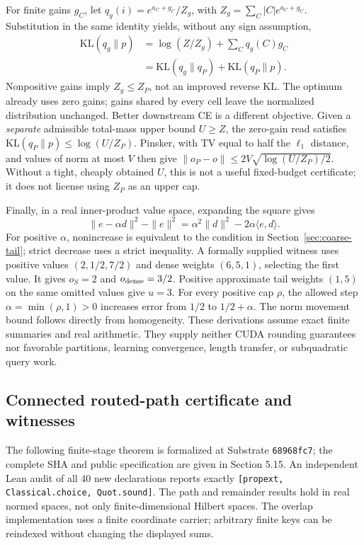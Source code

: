 \documentclass[11pt]{article}
\numberwithin{equation}{section}
\newcommand{\inner}[2]{\langle #1, #2\rangle}
\begin{document}
For finite gains $g_C$, let $q_g(i)=e^{a_C+g_C}/Z_g$, with $Z_g=\sum_C|C|e^{a_C+g_C}$. Substitution
in the same identity yields, without any sign assumption,
\begin{equation}\label{eq:coarse-gain-kl}
\begin{split}
\mathrm{KL}(q_g\|p)&=\log(Z/Z_g)+\sum_C q_g(C)g_C\\
&=\mathrm{KL}(q_g\|q_P)+\mathrm{KL}(q_P\|p).
\end{split}
\end{equation}
Nonpositive gains imply $Z_g\le Z_P$, not an improved reverse KL. The optimum already uses zero gains;
gains shared by every cell leave the normalized distribution unchanged. Better downstream CE is a
different objective. Given a \emph{separate} admissible total-mass upper bound $U\ge Z$, the zero-gain read
satisfies $\mathrm{KL}(q_P\|p)\le\log(U/Z_P)$. Pinsker, with TV equal to half the $\ell_1$ distance,
and values of norm at most $V$ then give
$\|o_P-o\|\le2V\sqrt{\log(U/Z_P)/2}$. Without a tight, cheaply obtained $U$, this is not a useful
fixed-budget certificate; it does not license using $Z_P$ as an upper cap.

Finally, in a real inner-product value space, expanding the square gives
\begin{equation}\label{eq:coarse-alignment}
\|e-\alpha d\|^2-\|e\|^2
=\alpha^2\|d\|^2-2\alpha\inner{e}{d}.
\end{equation}
For positive $\alpha$, nonincrease is equivalent to the condition in Section~\ref{sec:coarse-tail}; strict
decrease uses a strict inequality. A formally supplied witness uses positive values $(2,1/2,7/2)$ and
dense weights $(6,5,1)$, selecting the first value. It gives $o_S=2$ and $o_{\rm dense}=3/2$. Positive
approximate tail weights $(1,5)$ on the same omitted values give $u=3$. For every positive cap $\rho$,
the allowed step $\alpha=\min(\rho,1)>0$ increases error from $1/2$ to $1/2+\alpha$. The norm movement
bound follows directly from homogeneity. These derivations assume exact finite summaries and real arithmetic. They supply neither
CUDA rounding guarantees nor favorable partitions, learning convergence, length transfer, or
subquadratic query work.

\subsection{Connected routed-path certificate and witnesses}\label{app:routed-path}

The following finite-stage theorem is formalized at Substrate \texttt{68968fc7}; the complete SHA and
public specification are given in Section 5.15. An independent Lean audit of all 40 new declarations
reports exactly \texttt{[propext, Classical.choice, Quot.sound]}. The path and remainder results hold in
real normed spaces, not only finite-dimensional Hilbert spaces. The overlap implementation uses a finite
coordinate carrier; arbitrary finite keys can be reindexed without changing the displayed sums.
\end{document}

